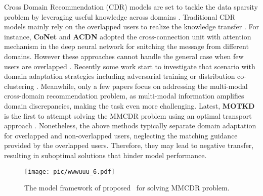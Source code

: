 %
Cross Domain Recommendation (CDR) models are set to tackle the data sparsity problem by leveraging useful knowledge across domains \cite{khan2017cross,cao2022cross,ddtcdr,dml,zhao2023cross,du2024identifiability}.
%
Traditional CDR models mainly rely on the overlapped users to realize the knowledge transfer \cite{zang2022survey,chen2024survey,li2024aiming,xu2024rethinking}.
%
For instance, \textbf{CoNet} \cite{conet} and \textbf{ACDN} \cite{liu2020exploiting} adopted the cross-connection unit with attention mechanism in the deep neural network for snitching the message from different domains.
%
However these approaches cannot handle the general case when few users are overlapped \cite{recdan,tdar,cdrsurvey}.
%
Recently some work \cite{darec,zhang2021learning} start to investigate that scenario with domain adaptation strategies including adversarial training \cite{gan} or distribution co-clustering \cite{vade}.
%
Meanwhile, only a few papers focus on addressing the multi-modal cross-domain recommendation problem, as multi-modal information amplifies domain discrepancies, making the task even more challenging.
%
Latest, \textbf{MOTKD} \cite{yang2023multimodal} is the first to attempt solving the MMCDR problem using an optimal transport approach \cite{gu2022keypoint,courty2016optimal,khamis2024scalable,li2022gromov,damodaran2018deepjdot}.
%
Nonetheless, the above methods typically separate domain adaptation for overlapped and non-overlapped users, neglecting the matching guidance provided by the overlapped users.
%
Therefore, they may lead to negative transfer, resulting in suboptimal solutions that hinder model performance.


 

\begin{figure*}
\centering
\texttt{[image: pic/wwwuuu\_6.pdf]}
\caption{The model framework of proposed \modelname~for solving MMCDR problem.}
\label{fig:sig}
\end{figure*}